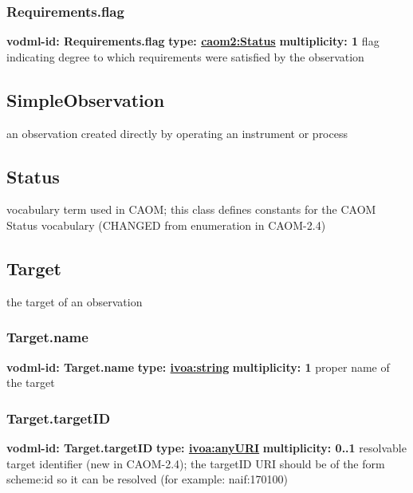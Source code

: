     \subsubsection{Requirements.flag}
      \textbf{vodml-id: Requirements.flag} \newline
      \textbf{type: \hyperref[sect:Status]{caom2:Status}} \newline
      \textbf{multiplicity: 1} \newline
      flag indicating degree to which requirements were satisfied by the observation

  \subsection{SimpleObservation}
  \label{sect:SimpleObservation}
    an observation created directly by operating an instrument or process

  \subsection{Status}
  \label{sect:Status}
    vocabulary term used in CAOM; this class defines constants for the CAOM Status vocabulary (CHANGED from enumeration in CAOM-2.4)

  \subsection{Target}
  \label{sect:Target}
    the target of an observation

    \subsubsection{Target.name}
      \textbf{vodml-id: Target.name} \newline
      \textbf{type: \hyperref[sect:ivoa]{ivoa:string}} \newline
      \textbf{multiplicity: 1} \newline
      proper name of the target

    \subsubsection{Target.targetID}
      \textbf{vodml-id: Target.targetID} \newline
      \textbf{type: \hyperref[sect:ivoa]{ivoa:anyURI}} \newline
      \textbf{multiplicity: 0..1} \newline
      resolvable target identifier (new in CAOM-2.4); the targetID URI should be of the form {scheme}:{id} so it can be resolved (for example: naif:170100)

